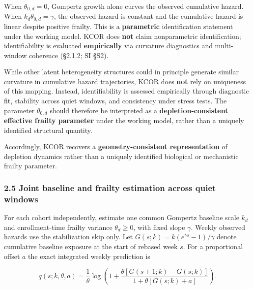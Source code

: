 \documentclass[
]{article}
\begin{document}
When \(\theta_{0,d}=0\), Gompertz growth alone curves the observed cumulative hazard. When \(k_d\theta_{0,d}=\gamma\), the observed hazard is constant and the cumulative hazard is linear despite positive frailty. This is a \textbf{parametric} identification statement under the working model. KCOR does \textbf{not} claim nonparametric identification; identifiability is evaluated \textbf{empirically} via curvature diagnostics and multi-window coherence (§2.1.2; SI §S2).

While other latent heterogeneity structures could in principle generate similar curvature in cumulative hazard trajectories, KCOR does \textbf{not} rely on uniqueness of this mapping. Instead, identifiability is assessed empirically through diagnostic fit, stability across quiet windows, and consistency under stress tests. The parameter \(\theta_{0,d}\) should therefore be interpreted as a \textbf{depletion-consistent effective frailty parameter} under the working model, rather than a uniquely identified structural quantity.

Accordingly, KCOR recovers a \textbf{geometry-consistent representation} of depletion dynamics rather than a uniquely identified biological or mechanistic frailty parameter.

\subsubsection{2.5 Joint baseline and frailty estimation across quiet windows}\label{joint-baseline-and-frailty-estimation-across-quiet-windows}

For each cohort independently, estimate one common Gompertz baseline scale \(k_d\) and enrollment-time frailty variance \(\theta_d\ge0\), with fixed slope \(\gamma\). Weekly observed hazards use the stabilization skip only. Let \(G(s;k)=k(e^{\gamma s}-1)/\gamma\) denote cumulative baseline exposure at the start of rebased week \(s\). For a proportional offset \(a\) the exact integrated weekly prediction is

\[q(s;k,\theta,a)=\frac{1}{\theta}\log\left(1+\frac{\theta[G(s+1;k)-G(s;k)]}{1+\theta[G(s;k)+a]}\right).\]
\end{document}
